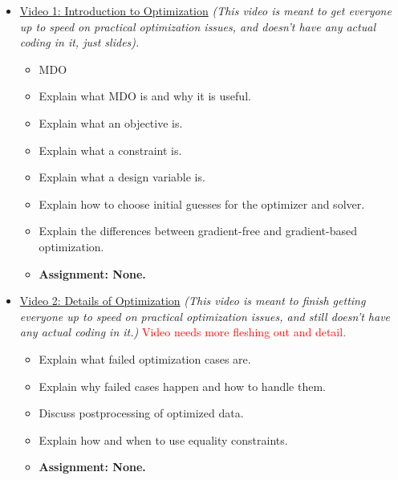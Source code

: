 \documentclass[12pt, letterpaper]{article}
\begin{document}
\begin{itemize}


	\item \underline{Video 1: Introduction to Optimization} \textit{(This video is meant to get everyone up to speed on practical optimization issues, and doesn't have any actual coding in it, just slides).} 
		\begin{itemize}
			\item MDO
			\item Explain what MDO is and why it is useful.
			\item Explain what an objective is.
			\item Explain what a constraint is.
			\item Explain what a design variable is.
			\item Explain how to choose initial guesses for the optimizer and solver.
			\item Explain the differences between gradient-free and gradient-based optimization.
			\item \textbf{Assignment: None.}
		\end{itemize}

	\item \underline{Video 2: Details of Optimization} \textit{(This video is meant to finish getting everyone up to speed on practical optimization issues, and still doesn't have any actual coding in it.)} \textcolor{red}{Video needs more fleshing out and detail.}
		\begin{itemize}
			\item Explain what failed optimization cases are.
			\item Explain why failed cases happen and how to handle them.
			\item Discuss postprocessing of optimized data.
			\item Explain how and when to use equality constraints.
			\item \textbf{Assignment: None.}
		\end{itemize}


\end{itemize}
\end{document}
